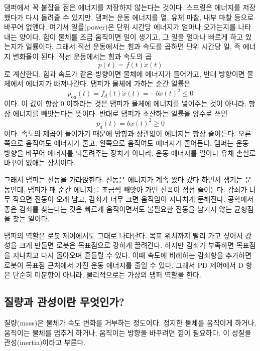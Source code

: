 댐퍼에서 꼭 붙잡을 점은 에너지를 저장하지 않는다는 것이다.
스프링은 에너지를 저장했다가 다시 돌려줄 수 있지만, 댐퍼는 운동 에너지를 열, 유체 마찰, 내부 마찰 등으로 바꾸어 없앤다.
여기서 일률(power)은 단위 시간당 에너지가 얼마나 오가는지를 나타내는 양이다.
힘이 물체를 조금 움직이면 일이 생기고, 그 일을 얼마나 빠르게 하고 있는지가 일률이다.
그래서 직선 운동에서는 힘과 속도를 곱하면 단위 시간당 일, 즉 에너지 변화율이 된다.
직선 운동에서는 힘과 속도의 곱
\begin{equation}
  p(t)=f(t)\dot{x}(t)
\end{equation}
로 계산한다.
힘과 속도가 같은 방향이면 물체에 에너지가 들어가고, 반대 방향이면 물체에서 에너지가 빠져나간다.
댐퍼가 물체에 가하는 순간 일률은
\begin{equation}
  p_{\mathrm{on}}(t)=f_d(t)\dot{x}(t)
  =
  -b\dot{x}(t)^2
  \le 0
\end{equation}
이다.
이 값이 항상 0 이하라는 것은 댐퍼가 물체에 에너지를 넣어주는 것이 아니라, 항상 에너지를 빼앗는다는 뜻이다.
반대로 댐퍼가 소산하는 일률을 양수로 쓰면
\begin{equation}
  p_d(t)=b\dot{x}(t)^2\ge 0
\end{equation}
이다.
속도의 제곱이 들어가기 때문에 방향과 상관없이 에너지는 항상 줄어든다.
오른쪽으로 움직여도 에너지가 줄고, 왼쪽으로 움직여도 에너지가 줄어든다.
댐퍼는 운동 방향을 바꾸어 에너지를 되돌려주는 장치가 아니라, 운동 에너지를 열이나 유체 손실로 바꾸어 없애는 장치이다.

그래서 댐퍼는 진동을 가라앉힌다.
진동은 에너지가 계속 왔다 갔다 하면서 생기는 운동인데, 댐퍼가 매 순간 에너지를 조금씩 빼앗아 가면 진폭이 점점 줄어든다.
감쇠가 너무 작으면 진동이 오래 남고, 감쇠가 너무 크면 움직임이 지나치게 둔해진다.
공학에서 좋은 감쇠를 찾는다는 것은 빠르게 움직이면서도 불필요한 진동을 남기지 않는 균형점을 찾는 일이다.

댐퍼의 역할은 로봇 제어에서도 그대로 나타난다.
목표 위치까지 빨리 가고 싶어서 강성을 크게 만들면 로봇은 목표점으로 강하게 끌려간다.
하지만 감쇠가 부족하면 목표점을 지나치고 다시 돌아오며 흔들릴 수 있다.
이때 속도에 비례하는 감쇠항을 추가하면 로봇이 목표점 근처에서 가진 운동 에너지를 줄일 수 있다.
그래서 PD 제어에서 D 항은 단순히 미분항이 아니라, 물리적으로는 가상의 댐퍼 역할을 한다.

\subsection{질량과 관성이란 무엇인가?}

질량(mass)은 물체가 속도 변화를 거부하는 정도이다.
정지한 물체를 움직이게 하거나, 움직이는 물체를 멈추게 하거나, 움직이는 방향을 바꾸려면 힘이 필요하다.
이 성질을 관성(inertia)이라고 부른다.

